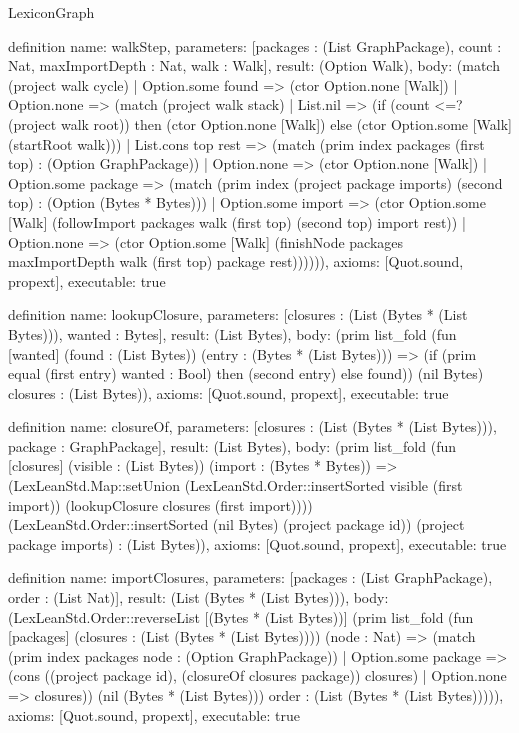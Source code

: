 \begin{lexlean}{LexiconGraph}
\begin{semanticmodule}
definition{
  name: walkStep,
  parameters: [packages : (List GraphPackage), count : Nat, maxImportDepth : Nat, walk : Walk],
  result: (Option Walk),
  body: (match (project walk cycle)
    | Option.some found => (ctor Option.none [Walk])
    | Option.none => (match (project walk stack)
      | List.nil => (if (count <=? (project walk root)) then (ctor Option.none [Walk]) else (ctor Option.some [Walk] (startRoot walk)))
      | List.cons top rest => (match (prim index packages (first top) : (Option GraphPackage))
        | Option.none => (ctor Option.none [Walk])
        | Option.some package => (match (prim index (project package imports) (second top) : (Option (Bytes * Bytes)))
          | Option.some import => (ctor Option.some [Walk] (followImport packages walk (first top) (second top) import rest))
          | Option.none => (ctor Option.some [Walk] (finishNode packages maxImportDepth walk (first top) package rest)))))),
  axioms: [Quot.sound, propext],
  executable: true
}

definition{
  name: lookupClosure,
  parameters: [closures : (List (Bytes * (List Bytes))), wanted : Bytes],
  result: (List Bytes),
  body: (prim list_fold (fun [wanted] (found : (List Bytes)) (entry : (Bytes * (List Bytes))) => (if (prim equal (first entry) wanted : Bool) then (second entry) else found)) (nil Bytes) closures : (List Bytes)),
  axioms: [Quot.sound, propext],
  executable: true
}

definition{
  name: closureOf,
  parameters: [closures : (List (Bytes * (List Bytes))), package : GraphPackage],
  result: (List Bytes),
  body: (prim list_fold (fun [closures] (visible : (List Bytes)) (import : (Bytes * Bytes)) => (LexLeanStd.Map::setUnion (LexLeanStd.Order::insertSorted visible (first import)) (lookupClosure closures (first import)))) (LexLeanStd.Order::insertSorted (nil Bytes) (project package id)) (project package imports) : (List Bytes)),
  axioms: [Quot.sound, propext],
  executable: true
}

definition{
  name: importClosures,
  parameters: [packages : (List GraphPackage), order : (List Nat)],
  result: (List (Bytes * (List Bytes))),
  body: (LexLeanStd.Order::reverseList [(Bytes * (List Bytes))] (prim list_fold (fun [packages] (closures : (List (Bytes * (List Bytes)))) (node : Nat) => (match (prim index packages node : (Option GraphPackage))
    | Option.some package => (cons ((project package id), (closureOf closures package)) closures)
    | Option.none => closures)) (nil (Bytes * (List Bytes))) order : (List (Bytes * (List Bytes))))),
  axioms: [Quot.sound, propext],
  executable: true
}


\end{semanticmodule}
\end{lexlean}
